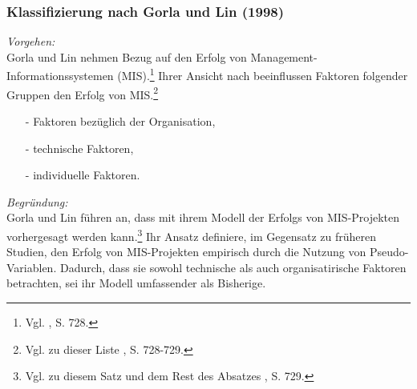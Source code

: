 \noindent
\subsubsection{Klassifizierung nach Gorla und Lin (1998)}
\textit{Vorgehen:}\\\noindent
Gorla und Lin nehmen Bezug auf den Erfolg von Management-Informationssystemen (\acs{MIS}).\footnote{Vgl. \cite{Gorla.1998}, S. 728.}
Ihrer Ansicht nach beeinflussen Faktoren folgender Gruppen den Erfolg von \ac{MIS}.\footnote{Vgl. zu dieser Liste \cite{Gorla.1998}, S. 728-729.}
\begin{itemize}\itemsep0pt
\item[-]Faktoren bezüglich der Organisation,
\item[-]technische Faktoren,
\item[-]individuelle Faktoren.
\end{itemize}
\textit{Begründung:}\\\noindent
Gorla und Lin führen an, dass mit ihrem Modell der Erfolgs von MIS-Projekten vorhergesagt werden kann.\footnote{Vgl. zu diesem Satz und dem Rest des Absatzes \cite{Gorla.1998}, S. 729.}
Ihr Ansatz definiere, im Gegensatz zu früheren Studien, den Erfolg von MIS-Projekten empirisch durch die Nutzung von Pseudo-Variablen.
Dadurch, dass sie sowohl technische als auch organisatirische Faktoren betrachten, sei ihr Modell umfassender als Bisherige.
